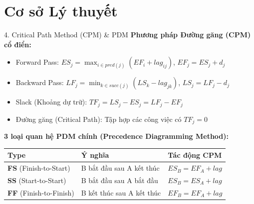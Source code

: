 \section{Cơ sở Lý thuyết}

\begin{frame}{4. Critical Path Method (CPM) \& PDM}
    \textbf{Phương pháp Đường găng (CPM) cổ điển:}
    \begin{itemize}
        \item Forward Pass: $ES_j = \max_{i \in pred(j)}(EF_i + lag_{ij})$, $EF_j = ES_j + d_j$
        \item Backward Pass: $LF_j = \min_{k \in succ(j)}(LS_k - lag_{jk})$, $LS_j = LF_j - d_j$
        \item Slack (Khoảng dự trữ): $TF_j = LS_j - ES_j = LF_j - EF_j$
        \item Đường găng (Critical Path): Tập hợp các công việc có $TF_j = 0$
    \end{itemize}
    \vspace{0.2cm}
    \textbf{3 loại quan hệ PDM chính (Precedence Diagramming Method):}
    \begin{table}
        \centering
        \footnotesize
        \begin{tabular}{@{}llp{6cm}@{}}
            \toprule
            \textbf{Type} & \textbf{Ý nghĩa} & \textbf{Tác động CPM} \\
            \midrule
            \textbf{FS} (Finish-to-Start) & B bắt đầu sau A kết thúc & $ES_B = EF_A + lag$ \\
            \textbf{SS} (Start-to-Start) & B bắt đầu sau A bắt đầu & $ES_B = ES_A + lag$ \\
            \textbf{FF} (Finish-to-Finish) & B kết thúc sau A kết thúc & $EF_B = EF_A + lag$ \\

            \bottomrule
        \end{tabular}
    \end{table}
\end{frame}

